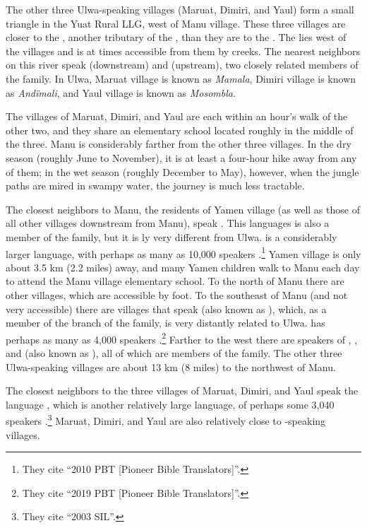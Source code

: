 The other three Ulwa-speaking villages (Maruat, Dimiri, and Yaul) form a small triangle in the Yuat Rural LLG, west of Manu village. These three villages are closer to the , another tributary of the , than they are to the . The  lies west of the villages and is at times accessible from them by creeks. The nearest neighbors on this river speak  (downstream) and  (upstream), two closely related members of the  family. In Ulwa, Maruat village is known as \textit{Mamala}, Dimiri village is known as \textit{Andïmali}, and Yaul village is known as \textit{Mosombla}.

The villages of Maruat, Dimiri, and Yaul are each within an hour’s walk of the other two, and they share an elementary school located roughly in the middle of the three. Manu is considerably farther from the other three villages. In the dry season (roughly June to November), it is at least a four-hour hike away from any of them; in the wet season (roughly December to May), however, when the jungle paths are mired in swampy water, the journey is much less tractable.

The closest neighbors to Manu, the residents of Yamen village (as well as those of all other villages downstream from Manu), speak . This languages is also a member of the  family, but it is ly very different from Ulwa. \mbox{} is a considerably larger language, with perhaps as many as 10,000 speakers \mbox{\citep{EberhardEtAl2023}.}\footnote{They cite “2010 PBT [Pioneer Bible Translators]”.} Yamen village is only about 3.5 km (2.2 miles) away, and many Yamen children walk to Manu each day to attend the Manu village elementary school. To the north of Manu there are other  villages, which are accessible by foot. To the southeast of Manu (and not very accessible) there are villages that speak  (also known as ), which, as a member of the  branch of the  family, is very distantly related to Ulwa.  has perhaps as many as 4,000 speakers \citep{EberhardEtAl2023}.\footnote{They cite “2019 PBT [Pioneer Bible Translators]”.} Farther to the west there are speakers of , , and  (also known as ), all of which are members of the  family. The other three Ulwa-speaking villages are about 13 km (8 miles) to the northwest of Manu.

The closest neighbors to the three villages of Maruat, Dimiri, and Yaul speak the  language , which is another relatively large language, of perhaps some 3,040 speakers \citep{EberhardEtAl2023}.\footnote{They cite “2003 SIL”.} Maruat, Dimiri, and Yaul are also relatively close to -speaking villages.

